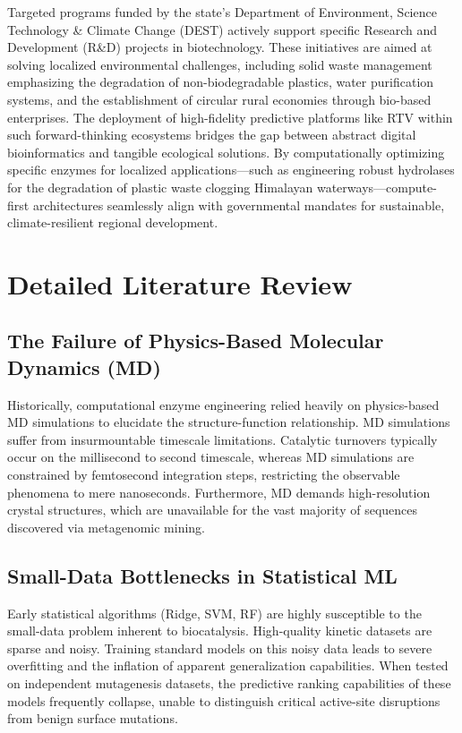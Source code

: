 \documentclass[11pt,a4paper,oneside]{article}
\begin{document}
Targeted programs funded by the state's Department of Environment, Science Technology \& Climate Change (DEST) actively support specific Research and Development (R\&D) projects in biotechnology. These initiatives are aimed at solving localized environmental challenges, including solid waste management emphasizing the degradation of non-biodegradable plastics, water purification systems, and the establishment of circular rural economies through bio-based enterprises. The deployment of high-fidelity predictive platforms like RTV within such forward-thinking ecosystems bridges the gap between abstract digital bioinformatics and tangible ecological solutions. By computationally optimizing specific enzymes for localized applications—such as engineering robust hydrolases for the degradation of plastic waste clogging Himalayan waterways—compute-first architectures seamlessly align with governmental mandates for sustainable, climate-resilient regional development.

\section{Detailed Literature Review}
\subsection{The Failure of Physics-Based Molecular Dynamics (MD)}
Historically, computational enzyme engineering relied heavily on physics-based MD simulations to elucidate the structure-function relationship. MD simulations suffer from insurmountable timescale limitations. Catalytic turnovers typically occur on the millisecond to second timescale, whereas MD simulations are constrained by femtosecond integration steps, restricting the observable phenomena to mere nanoseconds. Furthermore, MD demands high-resolution crystal structures, which are unavailable for the vast majority of sequences discovered via metagenomic mining.

\subsection{Small-Data Bottlenecks in Statistical ML}
Early statistical algorithms (Ridge, SVM, RF) are highly susceptible to the small-data problem inherent to biocatalysis. High-quality kinetic datasets are sparse and noisy. Training standard models on this noisy data leads to severe overfitting and the inflation of apparent generalization capabilities. When tested on independent mutagenesis datasets, the predictive ranking capabilities of these models frequently collapse, unable to distinguish critical active-site disruptions from benign surface mutations.
\end{document}
